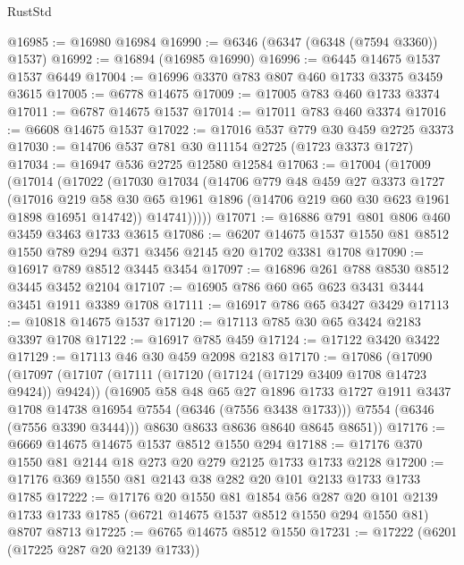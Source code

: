 \begin{lexlean}{RustStd}
\begin{coremodule}
@16985 := @16980 @16984
@16990 := @6346 (@6347 (@6348 (@7594 @3360)) @1537)
@16992 := @16894 (@16985 @16990)
@16996 := @6445 @14675 @1537 @1537 @6449
@17004 := @16996 @3370 @783 @807 @460 @1733 @3375 @3459 @3615
@17005 := @6778 @14675
@17009 := @17005 @783 @460 @1733 @3374
@17011 := @6787 @14675 @1537
@17014 := @17011 @783 @460 @3374
@17016 := @6608 @14675 @1537
@17022 := @17016 @537 @779 @30 @459 @2725 @3373
@17030 := @14706 @537 @781 @30 @11154 @2725 (@1723 @3373 @1727)
@17034 := @16947 @536 @2725 @12580 @12584
@17063 := @17004
    (@17009
      (@17014
        (@17022
          (@17030
            @17034
            (@14706
              @779
              @48
              @459
              @27
              @3373
              @1727
              (@17016
                @219
                @58
                @30
                @65
                @1961
                @1896
                (@14706 @219 @60 @30 @623 @1961 @1898 @16951 @14742))
              @14741)))))
@17071 := @16886 @791 @801 @806 @460 @3459 @3463 @1733 @3615
@17086 := @6207 @14675 @1537 @1550 @81 @8512 @1550 @789 @294 @371 @3456 @2145 @20 @1702 @3381 @1708
@17090 := @16917 @789 @8512 @3445 @3454
@17097 := @16896 @261 @788 @8530 @8512 @3445 @3452 @2104
@17107 := @16905 @786 @60 @65 @623 @3431 @3444 @3451 @1911 @3389 @1708
@17111 := @16917 @786 @65 @3427 @3429
@17113 := @10818 @14675 @1537
@17120 := @17113 @785 @30 @65 @3424 @2183 @3397 @1708
@17122 := @16917 @785 @459
@17124 := @17122 @3420 @3422
@17129 := @17113 @46 @30 @459 @2098 @2183
@17170 := @17086
    (@17090
      (@17097
        (@17107
          (@17111 (@17120 (@17124 (@17129 @3409 @1708 @14723 @9424)) @9424))
          (@16905
            @58
            @48
            @65
            @27
            @1896
            @1733
            @1727
            @1911
            @3437
            @1708
            @14738
            @16954
            @7554
            (@6346 (@7556 @3438 @1733)))
          @7554
          (@6346 (@7556 @3390 @3444)))
        @8630
        @8633
        @8636
        @8640
        @8645
        @8651))
@17176 := @6669 @14675 @14675 @1537 @8512 @1550 @294
@17188 := @17176 @370 @1550 @81 @2144 @18 @273 @20 @279 @2125 @1733 @1733 @2128
@17200 := @17176 @369 @1550 @81 @2143 @38 @282 @20 @101 @2133 @1733 @1733 @1785
@17222 := @17176
    @20
    @1550
    @81
    @1854
    @56
    @287
    @20
    @101
    @2139
    @1733
    @1733
    @1785
    (@6721 @14675 @1537 @8512 @1550 @294 @1550 @81)
    @8707
    @8713
@17225 := @6765 @14675 @8512 @1550
@17231 := @17222 (@6201 (@17225 @287 @20 @2139 @1733))

\end{coremodule}
\end{lexlean}
